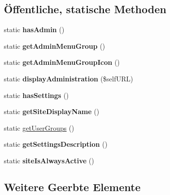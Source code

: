 \subsection*{Öffentliche, statische Methoden}
\begin{DoxyCompactItemize}
\item 
\mbox{\label{classadministrationimportmgsd2_ad4d9bcc02ba61c4151948eeb25617d9d}} 
static {\bfseries has\+Admin} ()
\item 
\mbox{\label{classadministrationimportmgsd2_ae83bd3196eb10cf785c45aab194c8311}} 
static {\bfseries get\+Admin\+Menu\+Group} ()
\item 
\mbox{\label{classadministrationimportmgsd2_a0931ffc8d64bc9048306b1a1b15d33aa}} 
static {\bfseries get\+Admin\+Menu\+Group\+Icon} ()
\item 
\mbox{\label{classadministrationimportmgsd2_a52e818f99d8e577cbd010a42f1141de7}} 
static {\bfseries display\+Administration} (\$self\+U\+RL)
\item 
\mbox{\label{classadministrationimportmgsd2_ac86bc4716a879704066b9190808e77f6}} 
static {\bfseries has\+Settings} ()
\item 
\mbox{\label{classadministrationimportmgsd2_aae037d3b329eab66dfa3c842168fa71b}} 
static {\bfseries get\+Site\+Display\+Name} ()
\item 
static \mbox{\hyperlink{classadministrationimportmgsd2_a0410fdb7c1b6300363740da6457389b9}{get\+User\+Groups}} ()
\item 
\mbox{\label{classadministrationimportmgsd2_a167ead84bee9cfe2c15ce855a4791281}} 
static {\bfseries get\+Settings\+Description} ()
\item 
\mbox{\label{classadministrationimportmgsd2_a4cb0fbe4a561cd5c50d4b0a10faaa74c}} 
static {\bfseries site\+Is\+Always\+Active} ()
\end{DoxyCompactItemize}
\subsection*{Weitere Geerbte Elemente}


